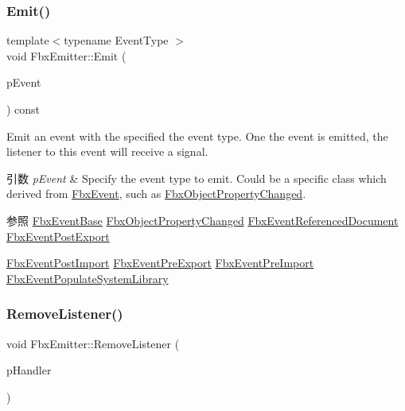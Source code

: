 \subsubsection{\texorpdfstring{Emit()}{Emit()}}
{\footnotesize\ttfamily template$<$typename Event\+Type $>$ \\
void Fbx\+Emitter\+::\+Emit (\begin{DoxyParamCaption}\item[{const Event\+Type \&}]{p\+Event }\end{DoxyParamCaption}) const}

Emit an event with the specified the event type. One the event is emitted, the listener to this event will receive a signal. 
\begin{DoxyParams}{引数}
{\em p\+Event} & Specify the event type to emit. Could be a specific class which derived from \hyperlink{class_fbx_event}{Fbx\+Event}, such as \hyperlink{class_fbx_object_property_changed}{Fbx\+Object\+Property\+Changed}. \\
\hline
\end{DoxyParams}
\begin{DoxySeeAlso}{参照}
\hyperlink{class_fbx_event_base}{Fbx\+Event\+Base} \hyperlink{class_fbx_object_property_changed}{Fbx\+Object\+Property\+Changed} \hyperlink{class_fbx_event_referenced_document}{Fbx\+Event\+Referenced\+Document} \hyperlink{class_fbx_event_post_export}{Fbx\+Event\+Post\+Export} 

\hyperlink{class_fbx_event_post_import}{Fbx\+Event\+Post\+Import} \hyperlink{class_fbx_event_pre_export}{Fbx\+Event\+Pre\+Export} \hyperlink{class_fbx_event_pre_import}{Fbx\+Event\+Pre\+Import} \hyperlink{class_fbx_event_populate_system_library}{Fbx\+Event\+Populate\+System\+Library} 
\end{DoxySeeAlso}
\mbox{\label{class_fbx_emitter_a9d5e8f773a85bd9f7a88d9f01eb5463d}} 
\subsubsection{\texorpdfstring{Remove\+Listener()}{RemoveListener()}}
{\footnotesize\ttfamily void Fbx\+Emitter\+::\+Remove\+Listener (\begin{DoxyParamCaption}\item[{\hyperlink{class_fbx_event_handler}{Fbx\+Event\+Handler} \&}]{p\+Handler }\end{DoxyParamCaption})}

